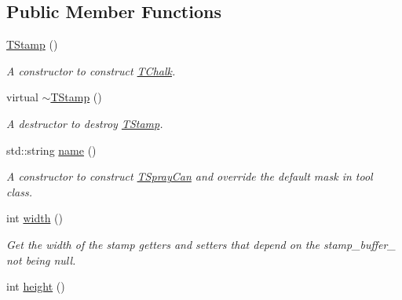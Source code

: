 \subsection*{Public Member Functions}
\begin{DoxyCompactItemize}
\item 
\hyperlink{classimage__tools_1_1TStamp_ac08d02caa080dc7b999a19792f6f7f9e}{T\+Stamp} ()\hypertarget{classimage__tools_1_1TStamp_ac08d02caa080dc7b999a19792f6f7f9e}{}\label{classimage__tools_1_1TStamp_ac08d02caa080dc7b999a19792f6f7f9e}

\begin{DoxyCompactList}\small\item\em A constructor to construct \hyperlink{classimage__tools_1_1TChalk}{T\+Chalk}. \end{DoxyCompactList}\item 
virtual \hyperlink{classimage__tools_1_1TStamp_a3d9cebfc900106a86856581af70307b9}{$\sim$\+T\+Stamp} ()\hypertarget{classimage__tools_1_1TStamp_a3d9cebfc900106a86856581af70307b9}{}\label{classimage__tools_1_1TStamp_a3d9cebfc900106a86856581af70307b9}

\begin{DoxyCompactList}\small\item\em A destructor to destroy \hyperlink{classimage__tools_1_1TStamp}{T\+Stamp}. \end{DoxyCompactList}\item 
std\+::string \hyperlink{classimage__tools_1_1TStamp_a1a1dec7161830a68bdaefbc0ec567855}{name} ()\hypertarget{classimage__tools_1_1TStamp_a1a1dec7161830a68bdaefbc0ec567855}{}\label{classimage__tools_1_1TStamp_a1a1dec7161830a68bdaefbc0ec567855}

\begin{DoxyCompactList}\small\item\em A constructor to construct \hyperlink{classimage__tools_1_1TSprayCan}{T\+Spray\+Can} and override the default mask in tool class. \end{DoxyCompactList}\item 
int \hyperlink{classimage__tools_1_1TStamp_a8ca8765351ee8e42bd576cb360a51335}{width} ()\hypertarget{classimage__tools_1_1TStamp_a8ca8765351ee8e42bd576cb360a51335}{}\label{classimage__tools_1_1TStamp_a8ca8765351ee8e42bd576cb360a51335}

\begin{DoxyCompactList}\small\item\em Get the width of the stamp getters and setters that depend on the stamp\+\_\+buffer\+\_\+ not being null. \end{DoxyCompactList}\item 
int \hyperlink{classimage__tools_1_1TStamp_a553c39533c9fda20f0a1dcd2d4947ada}{height} ()\hypertarget{classimage__tools_1_1TStamp_a553c39533c9fda20f0a1dcd2d4947ada}{}\label{classimage__tools_1_1TStamp_a553c39533c9fda20f0a1dcd2d4947ada}


\end{DoxyCompactItemize}
